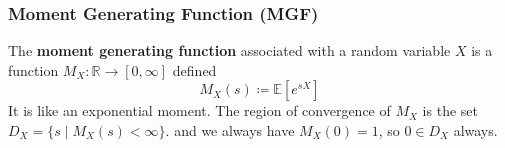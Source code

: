 \documentclass{article}
\begin{document}
    \subsubsection{Moment Generating Function (MGF)}

      \begin{definition}
        The \textbf{moment generating function} associated with a random variable $X$ is a function $M_X: \mathbb{R} \longrightarrow [0, \infty]$ defined 
        \begin{equation}
          M_X (s) \coloneqq \mathbb{E}[e^{s X}]
        \end{equation}
        It is like an exponential moment. The region of convergence of $M_X$ is the set $D_X = \{s \mid M_X (s) < \infty\}$. 
        and we always have $M_X (0) = 1$, so $0 \in D_X$ always. 
      \end{definition}
\end{document}

